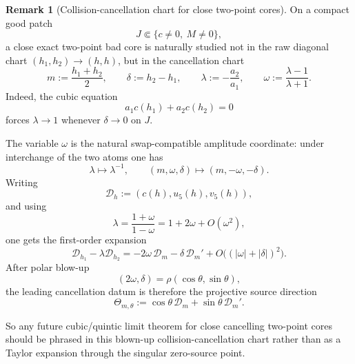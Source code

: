 \documentclass[11pt,a4paper]{amsart}
\theoremstyle{plain}
\theoremstyle{definition}
\newtheorem{remark}[theorem]{Remark}
\begin{document}
\begin{remark}[Collision-cancellation chart for close two-point cores]
\label{rem:wip-collision-cancellation-chart-two-point}
On a compact good patch
\[
J\Subset\{c\neq 0,\ M\neq 0\},
\]
a close exact two-point bad core is naturally studied not in the raw diagonal
chart $(h_1,h_2)\to(h,h)$, but in the cancellation chart
\[
m:=\frac{h_1+h_2}{2},
\qquad
\delta:=h_2-h_1,
\qquad
\lambda:=-\frac{a_2}{a_1},
\qquad
\omega:=\frac{\lambda-1}{\lambda+1}.
\]
Indeed, the cubic equation
\[
a_1c(h_1)+a_2c(h_2)=0
\]
forces $\lambda\to 1$ whenever $\delta\to 0$ on $J$.

The variable $\omega$ is the natural swap-compatible amplitude coordinate:
under interchange of the two atoms one has
\[
\lambda\longmapsto \lambda^{-1},
\qquad
(m,\omega,\delta)\longmapsto (m,-\omega,-\delta).
\]
Writing
\[
\mathcal D_h:=(c(h),u_5(h),v_5(h)),
\]
and using
\[
\lambda=\frac{1+\omega}{1-\omega}=1+2\omega+O(\omega^2),
\]
one gets the first-order expansion
\[
\mathcal D_{h_1}-\lambda \mathcal D_{h_2}
=
-2\omega\,\mathcal D_m-\delta\,\mathcal D_m'
+
O\!\bigl((|\omega|+|\delta|)^2\bigr).
\]
After polar blow-up
\[
(2\omega,\delta)=\rho(\cos\theta,\sin\theta),
\]
the leading cancellation datum is therefore the projective source direction
\[
\Theta_{m,\theta}
:=
\cos\theta\,\mathcal D_m+\sin\theta\,\mathcal D_m'.
\]

So any future cubic/quintic limit theorem for close cancelling two-point cores
should be phrased in this blown-up collision-cancellation chart rather than as a
Taylor expansion through the singular zero-source point.
\end{remark}
\end{document}

